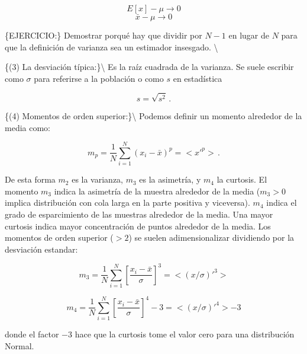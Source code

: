 \documentclass[
]{agujournal2019}
\begin{document}
\[E[x]-\mu \rightarrow {0}\] \[\bar{x}-\mu \rightarrow {0}\]

\{EJERCICIO:\} Demostrar porqué hay que dividir por \(N-1\) en lugar de
\(N\) para que la definición de varianza sea un estimador insesgado.
\textbackslash{}

\{\noindent (3) La desviación típica:\}\textbackslash{} Es la raíz
cuadrada de la varianza. Se suele escribir como \(\sigma\) para
referirse a la población o como \(s\) en estadística

\begin{equation}
s=\sqrt{s^2}\,.
\end{equation}

\vspace{0.5cm}

\{\noindent (4) Momentos de orden superior:\}\textbackslash{} Podemos
definir un momento alrededor de la media como:

\begin{equation}
m_p=\frac{1}{N}\sum^N_{i=1}(x_i-\bar{x})^p=<x'^p>\,.
\end{equation}

De esta forma \(m_2\) es la varianza, \(m_3\) es la asimetría, y \(m_4\)
la curtosis. El momento \(m_3\) indica la asimetría de la muestra
alrededor de la media (\(m_3>0\) implica distribución con cola larga en
la parte positiva y viceversa). \(m_4\) indica el grado de esparcimiento
de las muestras alrededor de la media. Una mayor curtosis indica mayor
concentración de puntos alrededor de la media. Los momentos de orden
superior (\(>2\)) se suelen adimensionalizar dividiendo por la
desviación estandar:

\begin{equation}
    m_3=\frac{1}{N}\sum^N_{i=1}\left[\frac{x_i-\bar{x}}{\sigma}\right]^3=<(x/\sigma)'^3>
\end{equation}

\begin{equation} 
    m_4=\frac{1}{N}\sum^N_{i=1}\left[\frac{x_i-\bar{x}}{\sigma}\right]^4-3=<(x/\sigma)'^4>-3
\end{equation}

donde el factor \(-3\) hace que la curtosis tome el valor cero para una
distribución Normal.

\vspace{0.5cm}

\begin{center}
\end{center}
\end{document}
